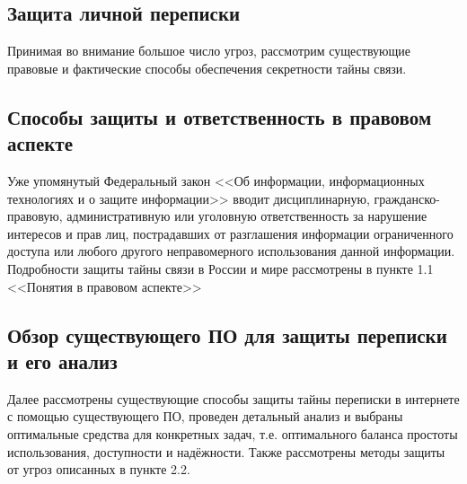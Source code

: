 \parindent=1cm %
\begin{center}
		
		\section{Защита личной переписки}
		
\end{center}

Принимая во внимание большое число угроз, рассмотрим существующие правовые и фактические способы обеспечения секретности тайны связи.
\subsection{Способы защиты и ответственность в правовом аспекте}

Уже упомянутый Федеральный закон <<Об информации, информационных технологиях и о защите информации>>   вводит дисциплинарную, гражданско-правовую, административную или уголовную ответственность за   нарушение интересов и прав лиц, пострадавших от разглашения информации ограниченного доступа или любого другого неправомерного использования данной информации.   Подробности защиты тайны связи в России и мире рассмотрены в пункте 1.1 <<Понятия в правовом аспекте>>
\subsection{Обзор существующего ПО для защиты переписки  и его анализ}
Далее  рассмотрены существующие способы защиты тайны переписки в интернете с помощью существующего ПО, проведен детальный анализ и выбраны оптимальные средства для конкретных задач, т.е. оптимального баланса простоты использования, доступности и надёжности. Также рассмотрены методы защиты от угроз описанных  в пункте 2.2. 
\\


